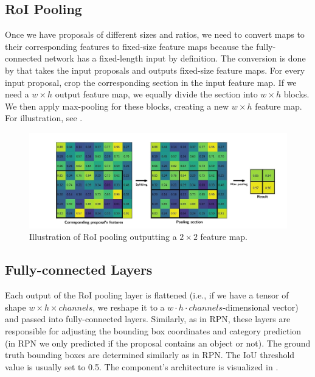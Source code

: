 \subsection{RoI Pooling}
Once we have proposals of different sizes and ratios, we need to convert
maps to their corresponding features to fixed-size feature maps because the
fully-connected network has a fixed-length input by definition. The conversion
is done by  that takes the input proposals and outputs
fixed-size feature maps.  For every input proposal, crop the corresponding
section in the input feature map. If we need a $w \times h$ output feature
map, we equally divide the section into $w \times h$ blocks. We then apply
max-pooling for these blocks, creating a new $w \times h$ feature map. For
illustration, see .
\begin{figure}[h]
    \centering
    \includegraphics[width=1.05\linewidth]{Sources/Figures/roi.png}
    \caption{Illustration of RoI pooling outputting a $2\times 2$ feature map.
        \cite{roipooling}}
    \label{fig:roipooling}
\end{figure}

\subsection{Fully-connected Layers}
Each output of the RoI pooling layer is flattened (i.e., if we have a
tensor of shape $w \times h\times channels$, we reshape it to a $w \cdot
    h \cdot channels$-dimensional vector) and passed into fully-connected
layers. Similarly, as in RPN, these layers are responsible for adjusting the
bounding box coordinates and category prediction (in RPN we only predicted
if the proposal contains an object or not). The ground truth bounding boxes
are determined similarly as in RPN. The IoU threshold value is usually set
to 0.5. The component's architecture is visualized in .

